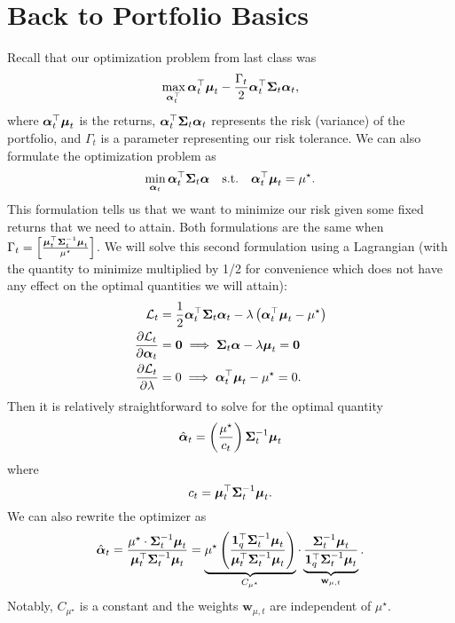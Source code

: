 \section{Back to Portfolio Basics}
Recall that our optimization problem from last class was $$ \max_{\boldsymbol{\alpha}_t^\top} \boldsymbol{\alpha}_t^\top\boldsymbol{\mu}_t - \frac{\Gamma_t}{2}\boldsymbol{\alpha}_t^\top\boldsymbol{\Sigma}_t\boldsymbol{\alpha}_t, $$ where $\boldsymbol{\alpha}_t^\top\boldsymbol{\mu}_t$ is the returns, $\boldsymbol{\alpha}_t^\top\boldsymbol{\Sigma}_t\boldsymbol{\alpha}_t$ represents the risk (variance) of the portfolio, and $\Gamma_t$ is a parameter representing our risk tolerance. We can also formulate the optimization problem as $$ \min_{\boldsymbol{\alpha}_t}\boldsymbol{\alpha}_t^\top\boldsymbol{\Sigma}_t\boldsymbol{\alpha}\quad\text{s.t.}\quad\boldsymbol{\alpha}_t^\top\boldsymbol{\mu}_t = \mu^\star. $$ This formulation tells us that we want to minimize our risk given some fixed returns that we need to attain. Both formulations are the same when $\Gamma_t=\left[ \frac{\boldsymbol{\mu}_t^\top\boldsymbol{\Sigma}_t^{-1}\boldsymbol{\mu}_t}{\mu^\star} \right]$. We will solve this second formulation using a Lagrangian (with the quantity to minimize multiplied by 1/2 for convenience which does not have any effect on the optimal quantities we will attain): \begin{align*}
	\mathcal L_t &= \frac{1}{2}\boldsymbol{\alpha}_t^\top\boldsymbol{\Sigma}_t\boldsymbol{\alpha}_t - \lambda \left( \boldsymbol{\alpha}_t^\top\boldsymbol{\mu}_t-\mu^\star \right) \\
	\frac{\partial\mathcal L_t}{\partial\boldsymbol{\alpha}_t} &= \mathbf 0 \implies \boldsymbol{\Sigma}_t\boldsymbol{\alpha} - \lambda\boldsymbol{\mu}_t = \mathbf 0 \\
	\frac{\partial\mathcal L_t}{\partial\lambda} &= 0 \implies \boldsymbol{\alpha}_t^\top\boldsymbol{\mu}_t-\mu^\star = 0.
\end{align*} Then it is relatively straightforward to solve for the optimal quantity $$ \hat{\boldsymbol{\alpha}}_t = \left( \frac{\mu^\star}{c_t} \right) \boldsymbol{\Sigma}_t^{-1}\boldsymbol{\mu}_t $$ where $$ c_t = \boldsymbol{\mu}_t^\top\boldsymbol{\Sigma}_t^{-1}\boldsymbol{\mu}_t. $$ 
We can also rewrite the optimizer as $$ \hat{\boldsymbol{\alpha}}_t = \frac{\mu^\star\cdot\boldsymbol{\Sigma}_t^{-1}\boldsymbol{\mu}_t}{\boldsymbol{\mu}_t^\top\boldsymbol{\Sigma}_t^{-1}\boldsymbol{\mu}_t} = \underbrace{\mu^\star \left( \frac{\mathbf 1_q^\top\boldsymbol{\Sigma}_t^{-1}\boldsymbol{\mu}_t}{\boldsymbol{\mu}_t^\top\boldsymbol{\Sigma}_t^{-1}\boldsymbol{\mu}_t} \right)}_{C_{\mu^\star}}\cdot\underbrace{\frac{\boldsymbol{\Sigma}_t^{-1}\boldsymbol{\mu}_t}{\mathbf 1_q^\top\boldsymbol{\Sigma}_t^{-1}\boldsymbol{\mu}_t}}_{\mathbf w_{\mu,t}}. $$ Notably, $C_{\mu^\star}$ is a constant and the weights $\mathbf w_{\mu,t}$ are independent of $\mu^\star$.


